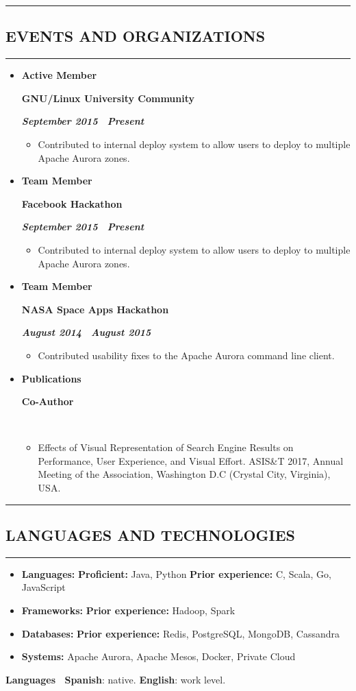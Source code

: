 \documentclass[10pt,letterpaper]{article}
\newcommand{\textbox}[1]{
  \parbox{.333\textwidth}{#1}
}
\newcommand{\CPP}
{C\nolinebreak[4]\hspace{-.05em}\raisebox{.22ex}{\footnotesize\bf ++}}
\newcommand{\sectionTitle}[1]{
  \hrule
  \vspace{-1.0em} 
  \subsection*{\uppercase{\textbf{#1}}}
  \vspace{-0.3em}
    \hrule
    \vspace{0.3em}  
}
\newcommand{\languageSection}[4]{
  \vspace{-0.5em}
  \begin{center}
    \textbf{Languages \textendash \ }\textbf{#1}: #2. \textbf{#3}: #4.
  \end{center}
}
\newcommand{\titleExperienceWithoutLocation}[4]{
  \vspace{1.0em}
  \item[]
  {
    \textbox{\textbf{#1}\hfill}\textbox{\hfil \textbf{#2}\hfil}\hfill \textbf{\emph{#3 \textendash \ #4}}
  }
}
\begin{document}
  \vspace{0.30em} 
  \sectionTitle{Events and Organizations}
  \vspace{-0.8em}
  \begin{itemize}
    \parskip=-0.6em 
    \titleExperienceWithoutLocation{Active Member}{GNU/Linux University Community}{September 2015}{Present}
      \begin{itemize}[label=\textbullet]
        \itemsep0em
        \item Contributed to internal deploy system to allow users to deploy to multiple Apache Aurora zones.
      \end{itemize}
  
    \vspace{-0.4em} 
    \titleExperienceWithoutLocation{Team Member}{Facebook Hackathon}{September 2015}{Present}
      \begin{itemize}[label=\textbullet]
        \itemsep0em
        \item Contributed to internal deploy system to allow users to deploy to multiple Apache Aurora zones.
      \end{itemize}
  
    \vspace{-0.4em} 
    \titleExperienceWithoutLocation{Team Member}{NASA Space Apps Hackathon}{August 2014}{August 2015}
      \begin{itemize}[label=\textbullet]
        \itemsep0em
        \item Contributed usability fixes to the Apache Aurora command line client.
      \end{itemize}

    \vspace{-0.4em} 
    \titleExperienceWithoutLocation{Publications}{Co-Author}{}{}
      \begin{itemize}[label=\textbullet]
        \itemsep0em
        \item Effects of Visual Representation of Search Engine Results on Performance, User Experience, and Visual Effort. ASIS\&T 2017,  Annual Meeting of the Association, Washington D.C (Crystal City, Virginia), USA.
      \end{itemize}
    \end{itemize} 
  \vspace{0.30em} 
  
  
  \sectionTitle{Languages and Technologies}
  \vspace{0.20em}
  \begin{itemize}[label=\textbullet]
    \itemsep0em
    \item \textbf{Languages:} \textbf{Proficient:} Java, Python \textbf{Prior experience:} \CPP, Scala, Go, JavaScript
    \item \textbf{Frameworks:} \textbf{Prior experience:} Hadoop, Spark
    \item \textbf{Databases:} \textbf{Prior experience:} Redis, PostgreSQL, MongoDB, Cassandra
    \item \textbf{Systems:} Apache Aurora, Apache Mesos, Docker, Private Cloud
  \end{itemize}
  
  \languageSection{Spanish}{native}{English}{work level}
  
\end{document}
